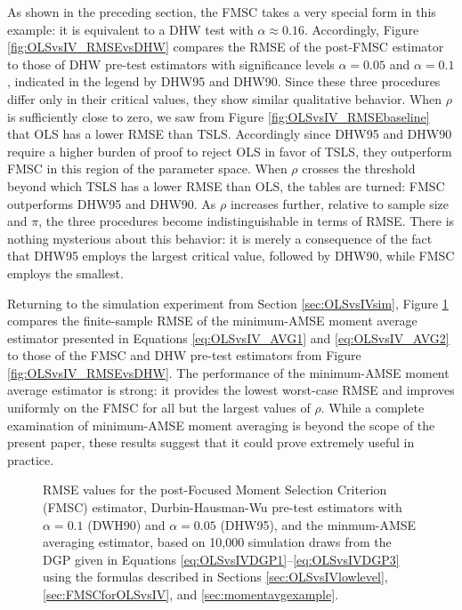 As shown in the preceding section, the FMSC takes a very special form in this example: it is equivalent to a DHW test with $\alpha \approx 0.16$.
Accordingly, Figure \ref{fig:OLSvsIV_RMSEvsDHW} compares the RMSE of the post-FMSC estimator to those of DHW pre-test estimators with significance levels $\alpha = 0.05$ and $\alpha = 0.1$, indicated in the legend by DHW95 and DHW90.
Since these three procedures differ only in their critical values, they show similar qualitative behavior.
When $\rho$ is sufficiently close to zero, we saw from Figure \ref{fig:OLSvsIV_RMSEbaseline} that OLS has a lower RMSE than TSLS.
Accordingly since DHW95 and DHW90 require a higher burden of proof to reject OLS in favor of TSLS, they outperform FMSC in this region of the parameter space.
When $\rho$ crosses the threshold beyond which TSLS has a lower RMSE than OLS, the tables are turned: FMSC outperforms DHW95 and DHW90.
As $\rho$ increases further, relative to sample size and $\pi$, the three procedures become indistinguishable in terms of RMSE.
There is nothing mysterious about this behavior: it is merely a consequence of the fact that DHW95 employs the largest critical value, followed by DHW90, while FMSC employs the smallest.
 


Returning to the simulation experiment from Section \ref{sec:OLSvsIVsim}, Figure \ref{fig:OLSvsIV_AVG} compares the finite-sample RMSE of the minimum-AMSE moment average estimator presented in Equations \ref{eq:OLSvsIV_AVG1} and \ref{eq:OLSvsIV_AVG2} to those of the FMSC and DHW pre-test estimators from Figure \ref{fig:OLSvsIV_RMSEvsDHW}.
The performance of the minimum-AMSE moment average estimator is strong: it provides the lowest worst-case RMSE and improves uniformly on the FMSC for all but the largest values of $\rho$.
While a complete examination of minimum-AMSE moment averaging is beyond the scope of the present paper, these results suggest that it could prove extremely useful in practice.

\begin{figure}
\centering
	
	\caption{RMSE values for the post-Focused Moment Selection Criterion (FMSC) estimator, Durbin-Hausman-Wu pre-test estimators with $\alpha = 0.1$ (DWH90) and $\alpha = 0.05$ (DHW95), and the minmum-AMSE averaging estimator, based on 10,000 simulation draws from the DGP given in Equations \ref{eq:OLSvsIVDGP1}--\ref{eq:OLSvsIVDGP3} using the formulas described in Sections \ref{sec:OLSvsIVlowlevel}, \ref{sec:FMSCforOLSvsIV}, and \ref{sec:momentavgexample}.}
	\label{fig:OLSvsIV_AVG}
\end{figure}